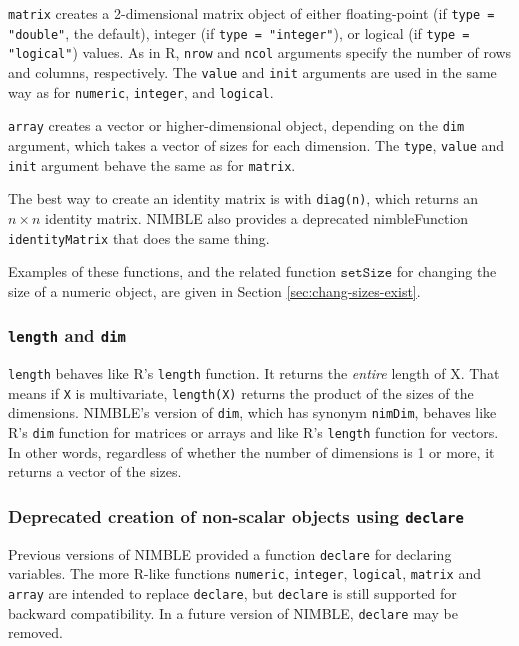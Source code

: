 \documentclass[12pt,oneside]{book}\usepackage[]{graphicx}\usepackage[]{color}
\def\cd#1{\texttt{#1}}
\begin{document}
\cd{matrix} creates a 2-dimensional matrix object of either floating-point (if 
\cd{type = "double"}, the default), integer (if \cd{type = "integer"}), or logical (if \cd{type = "logical"}) values. 
As in R, \cd{nrow} and \cd{ncol} arguments specify the number of rows and columns, respectively. 
The \cd{value} and \cd{init} arguments are used in the same way as for
\cd{numeric}, \cd{integer}, and \cd{logical}.

\cd{array} creates a vector or higher-dimensional object, depending
on the \cd{dim} argument, which takes a vector of sizes for each
dimension.  The \cd{type}, \cd{value} and \cd{init} argument behave
the same as for \cd{matrix}.

The best way to create an identity matrix is with \cd{diag(n)}, which
returns an $n \times n$ identity matrix.  NIMBLE also provides a deprecated
nimbleFunction \cd{identityMatrix} that does the same thing.

Examples of these functions, and the related function $\cd{setSize}$
for changing the size of a numeric object, are given in Section \ref{sec:chang-sizes-exist}.

\subsubsection{\cd{length} and \cd{dim}}
\label{sec:query-chang-sizes}

\cd{length} behaves like R's \cd{length} function.  It
  returns the \textit{entire} length of X.  That means if \cd{X} is
  multivariate, \cd{length(X)} returns the product of the sizes of
  the dimensions.  NIMBLE's version of \cd{dim}, which has synonym \cd{nimDim}, behaves like R's
  \cd{dim} function for matrices or arrays and like R's
  \cd{length} function for vectors.  In other words, regardless of
  whether the number of dimensions is 1 or more, it returns a vector
  of the sizes. 

\subsubsection{Deprecated creation of non-scalar objects using \cd{declare}}

Previous versions of NIMBLE provided a function \cd{declare} for
declaring variables.  The more R-like functions \cd{numeric},
\cd{integer}, \cd{logical}, \cd{matrix} and \cd{array} are intended to replace
\cd{declare}, but \cd{declare} is still supported for backward
compatibility.  In a future version of NIMBLE, \cd{declare} may be removed.
\end{document}
